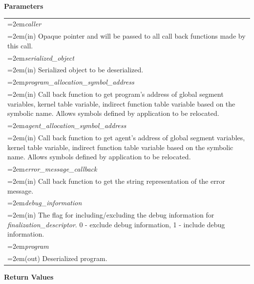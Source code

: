 \documentclass[final]{book}
\newcommand{\hsaarg}[1]{\textit{#1}}
\begin{document}
\noindent\textbf{Parameters}\\[-6mm]
\noindent\begin{longtable}{@{}>{\hangindent=2em}p{\textwidth}}
\hsaarg{caller}\\\hspace{2em}(in) Opaque pointer and will be passed to all call back functions made by this call.\\[2mm]
\hsaarg{serialized_\-object}\\\hspace{2em}(in) Serialized object to be deserialized.\\[2mm]
\hsaarg{program_\-allocation_\-symbol_\-address}\\\hspace{2em}(in) Call back function to get program's address of global segment variables, kernel table variable, indirect function table variable based on the symbolic name. Allows symbols defined by application to be relocated.\\[2mm]
\hsaarg{agent_\-allocation_\-symbol_\-address}\\\hspace{2em}(in) Call back function to get agent's address of global segment variables, kernel table variable, indirect function table variable based on the symbolic name. Allows symbols defined by application to be relocated.\\[2mm]
\hsaarg{error_\-message_\-callback}\\\hspace{2em}(in) Call back function to get the string representation of the error message.\\[2mm]
\hsaarg{debug_\-information}\\\hspace{2em}(in) The flag for including/excluding the debug information for \textit{finalization_\-descriptor}. 0 - exclude debug information, 1 - include debug information.\\[2mm]
\hsaarg{program}\\\hspace{2em}(out) Deserialized program.
\end{longtable}
\vspace{-5mm}\noindent\textbf{Return Values}\\[-6mm]
\end{document}
